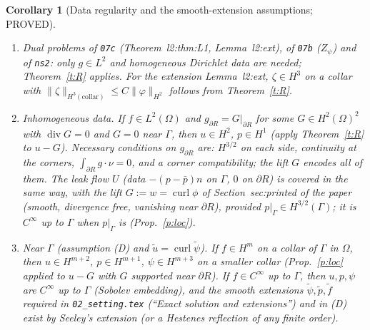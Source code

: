 \documentclass[11pt,reqno]{amsart}
\theoremstyle{plain}
\newtheorem{corollary}[theorem]{Corollary}
\theoremstyle{definition}
\newcommand{\ut}{\tilde u}
\newcommand{\pt}{\tilde p}
\newcommand{\ft}{\tilde f}
\newcommand{\norm}[1]{\lVert #1\rVert}
\newcommand{\curl}{\operatorname{curl}}
\renewcommand{\div}{\operatorname{div}}
\begin{document}
\begin{corollary}[Data regularity and the smooth-extension assumptions; PROVED]\label{c:D}
\begin{enumerate}[label=(\alph*)]
\item \emph{Dual problems} of \texttt{07c} (Theorem~l2:thm:L1, Lemma~l2:ext), of \texttt{07b} ($Z_\psi$) and of \texttt{ns2}: only $g\in L^2$ and homogeneous Dirichlet data are needed; Theorem~\ref{t:R} applies. For the extension Lemma~l2:ext, $\zeta\in H^3$ on a collar with $\norm\zeta_{H^3(\text{collar})}\le C\norm\varphi_{H^2}$ follows from Theorem~\ref{t:R}.
\item \emph{Inhomogeneous data.} If $f\in L^2(\Omega)$ and $g_{\partial R}=G|_{\partial R}$ for some $G\in H^2(\Omega)^2$ with $\div G=0$ and $G=0$ near $\Gamma$, then $u\in H^2$, $p\in H^1$ (apply Theorem~\ref{t:R} to $u-G$). Necessary conditions on $g_{\partial R}$ are: $H^{3/2}$ on each side, continuity at the corners, $\int_{\partial R}g\cdot\nu=0$, and a corner compatibility; the lift $G$ encodes all of them. The leak flow $U$ (data $-(p-\bar p)n$ on $\Gamma$, $0$ on $\partial R$) is covered in the same way, with the lift $G:=w=\curl\phi$ of Section~sec:printed of the paper (smooth, divergence free, vanishing near $\partial R$), provided $p|_\Gamma\in H^{3/2}(\Gamma)$; it is $C^\infty$ up to $\Gamma$ when $p|_\Gamma$ is (Prop.~\ref{p:loc}).
\item \emph{Near $\Gamma$ (assumption (D) and $\ut=\curl\tilde\psi$).} If $f\in H^m$ on a collar of $\Gamma$ in $\Omega$, then $u\in H^{m+2}$, $p\in H^{m+1}$, $\psi\in H^{m+3}$ on a smaller collar (Prop.~\ref{p:loc} applied to $u-G$ with $G$ supported near $\partial R$). If $f\in C^\infty$ up to $\Gamma$, then $u,p,\psi$ are $C^\infty$ up to $\Gamma$ (Sobolev embedding), and the smooth extensions $\tilde\psi,\pt,\ft$ required in \texttt{02\_setting.tex} (``Exact solution and extensions'') and in (D) exist by Seeley's extension (or a Hestenes reflection of any finite order).
\end{enumerate}
\end{corollary}
\end{document}
